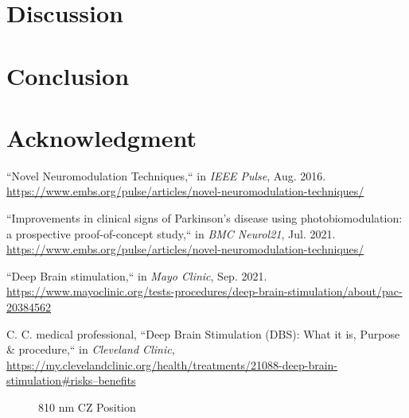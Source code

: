 \documentclass[journal,twoside,web]{ieeecolor}
\begin{document}
\section{Discussion}
\label{sec:next steps}

\section{Conclusion}
\label{sec:conclusion}

\section*{Acknowledgment}

\begin{thebibliography}{00}

 ``Novel Neuromodulation Techniques,`` in \emph{IEEE Pulse}, Aug. 2016. 
\underline{https://www.embs.org/pulse/articles/novel-neuromodulation-techniques/} 

 ``Improvements in clinical signs of Parkinson's disease using photobiomodulation: a prospective proof-of-concept study,`` in \emph{BMC Neurol21}, Jul. 2021. 
\underline{https://www.embs.org/pulse/articles/novel-neuromodulation-techniques/} 

 ``Deep Brain stimulation,`` in \emph{Mayo Clinic}, Sep. 2021. 
\underline{https://www.mayoclinic.org/tests-procedures/deep-brain-stimulation/about/pac-20384562}

 C. C. medical professional, ``Deep Brain Stimulation (DBS): What it is, Purpose \& procedure,`` in \emph{Cleveland Clinic}, 
\underline{https://my.clevelandclinic.org/health/treatments/21088-deep-brain-stimulation\#risks--benefits}

\end{thebibliography}

\begin{figure}[!htb]
    \caption{\label{fig:810-CZ} 810 nm CZ Position}
\end{figure}
\end{document}
